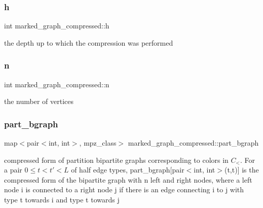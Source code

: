 \subsubsection{\texorpdfstring{h}{h}}
{\footnotesize\ttfamily int marked\+\_\+graph\+\_\+compressed\+::h}



the depth up to which the compression was performed 

\mbox{\label{classmarked__graph__compressed_a8d841016ddb11cfd33748c8deb6277ba}} 
\subsubsection{\texorpdfstring{n}{n}}
{\footnotesize\ttfamily int marked\+\_\+graph\+\_\+compressed\+::n}



the number of vertices 

\mbox{\label{classmarked__graph__compressed_a7b3267063fba30b45eb21b3ba4e07536}} 
\subsubsection{\texorpdfstring{part\+\_\+bgraph}{part\_bgraph}}
{\footnotesize\ttfamily map$<$pair$<$int, int$>$, mpz\+\_\+class$>$ marked\+\_\+graph\+\_\+compressed\+::part\+\_\+bgraph}



compressed form of partition bipartite graphs corresponding to colors in $C_<$. For a pair $0 \leq t < t' < L$ of half edge types, part\+\_\+bgraph\mbox{[}pair$<$int, int$>$(t,t\textquotesingle{})\mbox{]} is the compressed form of the bipartite graph with n left and right nodes, where a left node i is connected to a right node j if there is an edge connecting i to j with type t towards i and type t\textquotesingle{} towards j 

\mbox{\label{classmarked__graph__compressed_ae179a4737e6eab905c18a94d44ef64b7}} 
